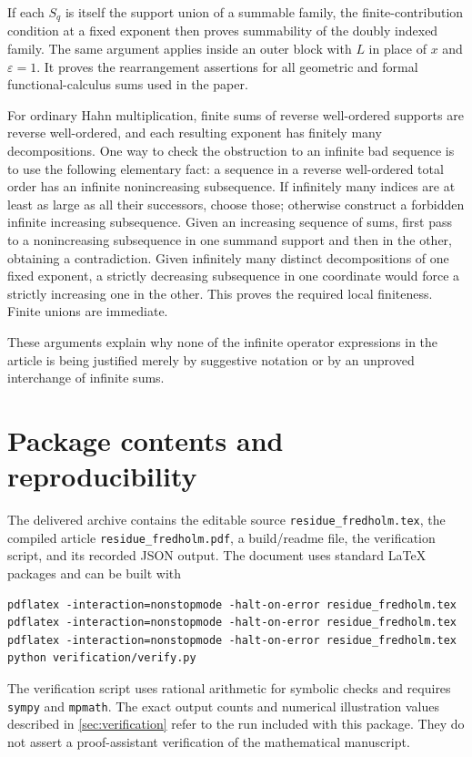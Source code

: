 \documentclass[11pt,a4paper]{article}
\numberwithin{equation}{section}
\theoremstyle{definition}
\theoremstyle{remark}
\newcommand{\eps}{\varepsilon}
\begin{document}
If each $S_q$ is itself the support union of a summable family, the finite-contribution condition at a fixed exponent then proves summability of the doubly indexed family. The same argument applies inside an outer block with $L$ in place of $x$ and $\eps=1$. It proves the rearrangement assertions for all geometric and formal functional-calculus sums used in the paper.

For ordinary Hahn multiplication, finite sums of reverse well-ordered supports are reverse well-ordered, and each resulting exponent has finitely many decompositions. One way to check the obstruction to an infinite bad sequence is to use the following elementary fact: a sequence in a reverse well-ordered total order has an infinite nonincreasing subsequence. If infinitely many indices are at least as large as all their successors, choose those; otherwise construct a forbidden infinite increasing subsequence. Given an increasing sequence of sums, first pass to a nonincreasing subsequence in one summand support and then in the other, obtaining a contradiction. Given infinitely many distinct decompositions of one fixed exponent, a strictly decreasing subsequence in one coordinate would force a strictly increasing one in the other. This proves the required local finiteness. Finite unions are immediate.

These arguments explain why none of the infinite operator expressions in the article is being justified merely by suggestive notation or by an unproved interchange of infinite sums.

\section{Package contents and reproducibility}
The delivered archive contains the editable source \texttt{residue\_fredholm.tex}, the compiled article \texttt{residue\_fredholm.pdf}, a build/readme file, the verification script, and its recorded JSON output. The document uses standard \LaTeX{} packages and can be built with
\begin{verbatim}
pdflatex -interaction=nonstopmode -halt-on-error residue_fredholm.tex
pdflatex -interaction=nonstopmode -halt-on-error residue_fredholm.tex
pdflatex -interaction=nonstopmode -halt-on-error residue_fredholm.tex
python verification/verify.py
\end{verbatim}
The verification script uses rational arithmetic for symbolic checks and requires \texttt{sympy} and \texttt{mpmath}. The exact output counts and numerical illustration values described in \cref{sec:verification} refer to the run included with this package. They do not assert a proof-assistant verification of the mathematical manuscript.
\end{document}
